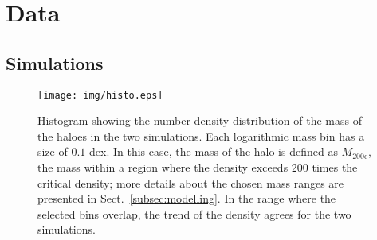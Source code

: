 \documentclass[a4paper,fleqn,usenatbib]{mnras}
\begin{document}
\section{Data}
\label{sec:data}
\subsection{Simulations}
\label{subsec:sim}
\begin{figure}
	\centerline{
	\texttt{[image: img/histo.eps]}}
	\caption{Histogram showing the number density distribution of the mass of the haloes in the two simulations. Each logarithmic mass bin has a size of $0.1$ dex.
	In this case, the mass of the halo is defined as $M_{200\mathrm{c}}$, the mass within a region where the density exceeds 200 times the critical density; more details about the chosen mass ranges are presented in Sect.~\ref{subsec:modelling}. In the range where the selected bins overlap, the trend of the density agrees for the two simulations.}
	\label{fig:histo}
\end{figure}
\end{document}
